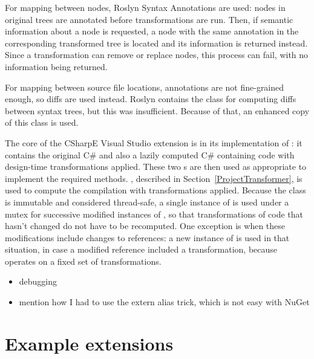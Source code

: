 For mapping between nodes, Roslyn Syntax Annotations are used: nodes in original trees are annotated before transformations are run. Then, if semantic information about a node is requested, a node with the same annotation in the corresponding transformed tree is located and its information is returned instead. Since a transformation can remove or replace nodes, this process can fail, with no information being returned.

For mapping between source file locations, annotations are not fine-grained enough, so diffs are used instead. Roslyn contains the  class for computing diffs between syntax trees, but this was insufficient. Because of that, an enhanced copy of this class is used.

\medskip

The core of the CSharpE Visual Studio extension is in its implementation of : it contains the original C\#  and also a lazily computed C\#  containing code with design-time transformations applied. These two s are then used as appropriate to implement the required  methods. , described in Section~\ref{ProjectTransformer}, is used to compute the compilation with transformations applied. Because the  class is immutable and considered thread-safe, a single instance of  is used under a mutex for successive modified instances of , so that transformations of code that hasn't changed do not have to be recomputed. One exception is when these modifications include changes to references: a new instance of  is used in that situation, in case a modified reference included a transformation, because  operates on a fixed set of transformations.

\begin{itemize}
\item debugging
\item mention how I had to use the extern alias trick, which is not easy with NuGet
\end{itemize}

\section{Example extensions}
